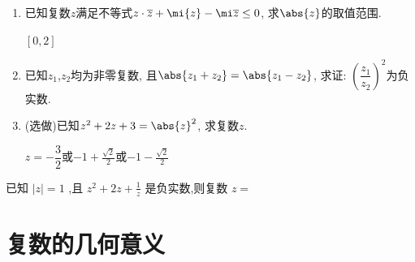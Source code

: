 \begin{enumerate}
\item 已知复数$z$满足不等式$z\cdot\overline{z}+\mi{z}-\mi\overline{z}\leq 0$, 求$\abs{z}$的取值范围. 
\begin{jieda}
    $[0,2]$
\end{jieda}

\item 已知$z_1$,$ z_2$均为非零复数, 且$\abs{z_1+z_2}=\abs{z_1-z_2}$, 求证: $\left(\dfrac{z_1}{z_2}\right)^2$为负实数. 


\item (选做)已知$z^2+2z+3=\abs{z}^2$, 求复数$z$. 
\begin{jieda}
    $z=-\dfrac{3}{2}$或$-1+\frac{\sqrt{2}}{2}$或$-1-\frac{\sqrt{2}}{2}$
\end{jieda}
\end{enumerate}


\item 已知 $\left| z\right|  = 1$ ,且 ${z}^{2} + {2z} + \frac{1}{z}$ 是负实数,则复数 $z =$

\section{复数的几何意义}
